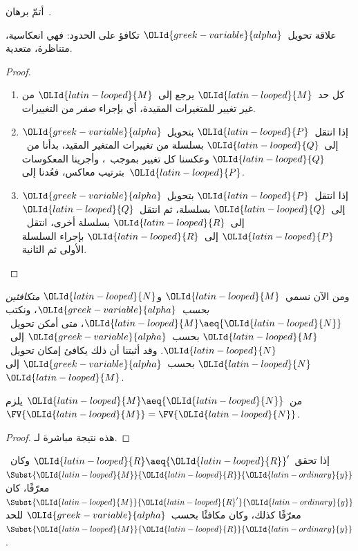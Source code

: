 \documentclass[../../../include/open-logic-section]{subfiles}
\begin{document}
\begin{prob}
  أتمّ برهان~.
\end{prob}

\begin{thm}
  علاقة تحويل~${\OLId{greek-variable}{alpha}}$ تكافؤ على الحدود: فهي انعكاسية، متناظرة، متعدية.
\end{thm}

\begin{proof}
  \begin{enumerate}
  \item كل حد~${\OLId{latin-looped}{M}}$ يرجع إلى~${\OLId{latin-looped}{M}}$ من غير تغيير للمتغيرات المقيدة،
    أي بإجراء \emph{صفر} من التغييرات.
  \item إذا انتقل~${\OLId{latin-looped}{P}}$ بتحويل~${\OLId{greek-variable}{alpha}}$ إلى~${\OLId{latin-looped}{Q}}$ بسلسلة من تغييرات المتغير المقيد،
    بدأنا من~${\OLId{latin-looped}{Q}}$ وعكسنا كل تغيير بموجب~،
    وأجرينا المعكوسات بترتيب معاكس، فعُدنا إلى~${\OLId{latin-looped}{P}}$.
  \item إذا انتقل~${\OLId{latin-looped}{P}}$ بتحويل~${\OLId{greek-variable}{alpha}}$ إلى~${\OLId{latin-looped}{Q}}$ بسلسلة،
    ثم انتقل~${\OLId{latin-looped}{Q}}$ إلى~${\OLId{latin-looped}{R}}$ بسلسلة أخرى،
    انتقل~${\OLId{latin-looped}{P}}$ إلى~${\OLId{latin-looped}{R}}$ بإجراء السلسلة الأولى ثم الثانية.
  \end{enumerate}
\end{proof}

ومن الآن نسمي~${\OLId{latin-looped}{M}}$ و${\OLId{latin-looped}{N}}$ \emph{متكافئين بحسب~${\OLId{greek-variable}{alpha}}$}، ونكتب
${\OLId{latin-looped}{M}} \aeq {\OLId{latin-looped}{N}}$، متى أمكن تحويل~${\OLId{latin-looped}{M}}$ بحسب~${\OLId{greek-variable}{alpha}}$ إلى~${\OLId{latin-looped}{N}}$.
وقد أثبتنا أن ذلك يكافئ إمكان تحويل~${\OLId{latin-looped}{N}}$ بحسب~${\OLId{greek-variable}{alpha}}$ إلى~${\OLId{latin-looped}{M}}$.

\begin{thm}
  من~${\OLId{latin-looped}{M}} \aeq {\OLId{latin-looped}{N}}$ يلزم~$\FV{{\OLId{latin-looped}{M}}} = \FV{{\OLId{latin-looped}{N}}}$.
\end{thm}

\begin{proof}
  هذه نتيجة مباشرة لـ.
\end{proof}

\begin{lem}
  إذا تحقق~${\OLId{latin-looped}{R}} \aeq {\OLId{latin-looped}{R}}'$ وكان~$\Subst{{\OLId{latin-looped}{M}}}{{\OLId{latin-looped}{R}}}{{\OLId{latin-ordinary}{y}}}$ معرّفًا، كان
  $\Subst{{\OLId{latin-looped}{M}}}{{\OLId{latin-looped}{R}}'}{{\OLId{latin-ordinary}{y}}}$ معرّفًا كذلك، وكان مكافئًا بحسب~${\OLId{greek-variable}{alpha}}$ للحد~$\Subst{{\OLId{latin-looped}{M}}}{{\OLId{latin-looped}{R}}}{{\OLId{latin-ordinary}{y}}}$.
\end{lem}
\end{document}
